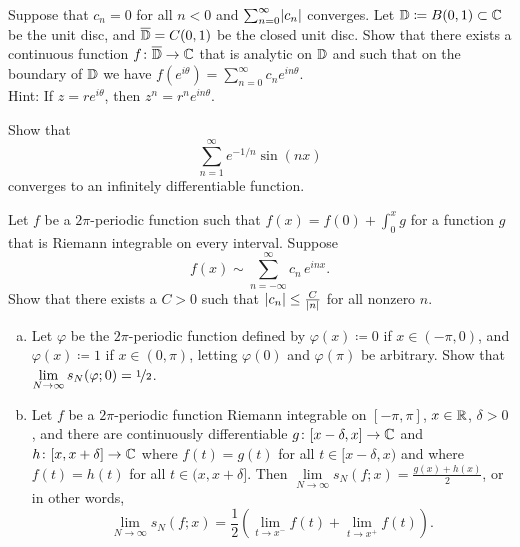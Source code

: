 \begin{exercise}
Suppose that $c_n = 0$ for all $n < 0$ and $\sum_{n=0}^\infty \lvert {c_n} \rvert$
converges.  Let ${\mathbb{D}} \coloneqq B(0,1) \subset {\mathbb{C}}$ be the unit disc,
and $\overline{{\mathbb{D}}} = C(0,1)$ be the closed unit disc.
Show that there exists a continuous function
$f \colon \overline{{\mathbb{D}}} \to {\mathbb{C}}$ that is analytic on ${\mathbb{D}}$
and such that on the boundary of ${\mathbb{D}}$ we have
$f(e^{i\theta}) = \sum_{n=0}^\infty c_n e^{in\theta}$.\\
Hint: If $z=re^{i\theta}$, then $z^n = r^n e^{in\theta}$.
\end{exercise}

\begin{exercise}
Show that
\begin{equation*}
\sum_{n=1}^\infty e^{-1/n} \sin(n x)
\end{equation*}
converges to an infinitely differentiable function.
\end{exercise}

\begin{exercise} \label{exercise:fsdiffmindecay}
Let $f$ be a $2\pi$-periodic function
such that $f(x) = f(0) + \int_0^x g$
for a function $g$ that is Riemann integrable on every interval.
Suppose
\begin{equation*}
f(x) \sim
\sum_{n=-\infty}^\infty c_n \,e^{inx} .
\end{equation*}
Show that there exists a $C > 0$ such that
$\lvert {c_n} \rvert \leq \frac{C}{\lvert {n} \rvert}$ for all nonzero $n$.
\end{exercise}

\begin{exercise}
\leavevmode
\begin{enumerate}[a)]
\item
Let $\varphi$ be the $2\pi$-periodic function 
defined by $\varphi(x) \coloneqq 0$ if $x \in (-\pi,0)$,
and $\varphi(x) \coloneqq 1$ if $x \in (0,\pi)$,
letting $\varphi(0)$ and $\varphi(\pi)$ be arbitrary.  Show
that $\lim\limits_{N \to \infty} s_N(\varphi;0) = \nicefrac{1}{2}$.
\item
Let $f$ be a $2\pi$-periodic function
Riemann integrable on $[-\pi,\pi]$, 
$x \in {\mathbb{R}}$, $\delta > 0$, and
there are continuously differentiable
$g \colon [x-\delta,x] \to {\mathbb{C}}$
and $h \colon [x,x+\delta] \to {\mathbb{C}}$
where $f(t) = g(t)$ for all $t \in [x-\delta,x)$
and
where $f(t) = h(t)$ for all $t \in (x,x+\delta]$.
Then
$\lim\limits_{N\to\infty} s_N(f;x) = \frac{g(x)+h(x)}{2}$, or in other words,
\begin{equation*}
\lim_{N \to \infty} s_N(f;x) =
\frac{1}{2}
\left(
\lim_{t \to x^-} f(t) +
\lim_{t \to x^+} f(t)
\right) .
\end{equation*}
\end{enumerate}
\end{exercise}

